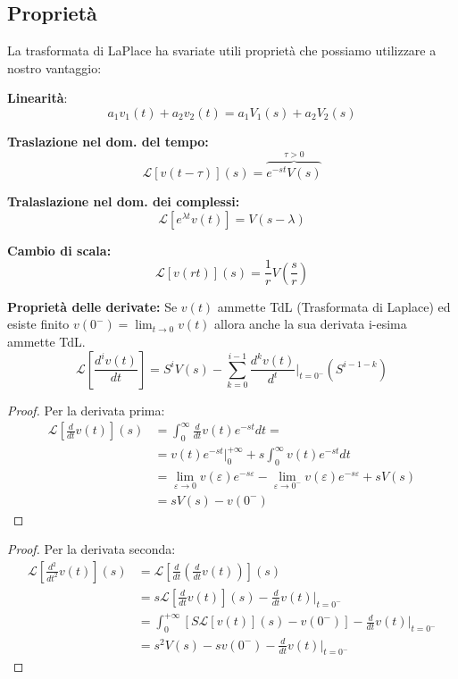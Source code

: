 \documentclass[a4paper]{article}
\begin{document}
\subsection{Proprietà}

La trasformata di LaPlace ha svariate utili proprietà che possiamo utilizzare a nostro vantaggio:
\indent
\begin{property}
\label{prop:linearity_lap}
    \textbf{Linearità}: \[a_1v_1(t) + a_2v_2(t) = a_1V_1(s) + a_2V_2(s)\]
\end{property}
\begin{property}
\label{prop:traslas_time_lap}
    \textbf{Traslazione nel dom. del tempo: } \[\mathcal{L}[v(t-\tau)](s) = \overbrace{e^{-st}V(s)}^{\tau > 0}\]
\end{property}
\begin{property}
\label{prop:traslas_compl_lap}
    \textbf{Tralaslazione nel dom. dei complessi: }
    \[\mathcal{L}[e^{\lambda t}v(t)] = V(s - \lambda)\]
\end{property}
\begin{property}
\label{prop:cambio_di_scala}
    \textbf{Cambio di scala:}
    \[\mathcal{L}[v(rt)](s) = \frac{1}{r}V\left(\frac{s}{r}\right)\]
\end{property}
\begin{property}
\label{prop:derivata_lap}
    \textbf{Proprietà delle derivate:} Se $v(t)$ ammette TdL (Trasformata di Laplace) ed esiste finito $v(0^-) = \lim_{t \rightarrow 0} v(t)$ 
    allora anche la sua derivata i-esima ammette TdL.
    \[\mathcal{L}\left[\frac{d^iv(t)}{dt}\right] = S^iV(s) - \sum_{k = 0}^{i-1} \frac{d^kv(t)}{d^t}\bigg|_{t = 0^-} (S^{i-1-k})\]
\end{property}
\begin{proof}
    Per la derivata prima:
    \begin{align*}
        \mathcal{L}\left[\frac{d}{dt}v(t)\right](s) &= \int_{0}^{\infty} \frac{d}{dt}v(t)e^{-st}dt =\\ 
        &= v(t)e^{-st}\bigg|_0^{+\infty} + s\int_{0}^{\infty}v(t)e^{-st}dt\\
        &= \lim_{\varepsilon \rightarrow 0} v(\varepsilon)e^{-s\varepsilon} - \lim_{\varepsilon \rightarrow 0^-} v(\varepsilon)e^{-s\varepsilon} + sV(s)\\
        &= sV(s) - v(0^-)
    \end{align*}
\end{proof}
\begin{proof}
    Per la derivata seconda:
    \begin{align*}
        \mathcal{L}\left[\frac{d^2}{dt^2}v(t)\right](s) &= \mathcal{L}\left[\frac{d}{dt}\left(\frac{d}{dt}v(t)\right)\right](s)\\  &= s\mathcal{L}\left[\frac{d}{dt}v(t)\right](s) - \frac{d}{dt} v(t)\bigg|_{t = 0^-}\\
        &= \int_{0}^{+\infty} \left[S\mathcal{L}[v(t)](s) - v(0^-)\right] - \frac{d}{dt}v(t)\bigg|_{t = 0^-}\\
        &= s^2V(s) - sv(0^-) - \frac{d}{dt}v(t)\bigg|_{t = 0^-}
    \end{align*}
\end{proof}
\end{document}
